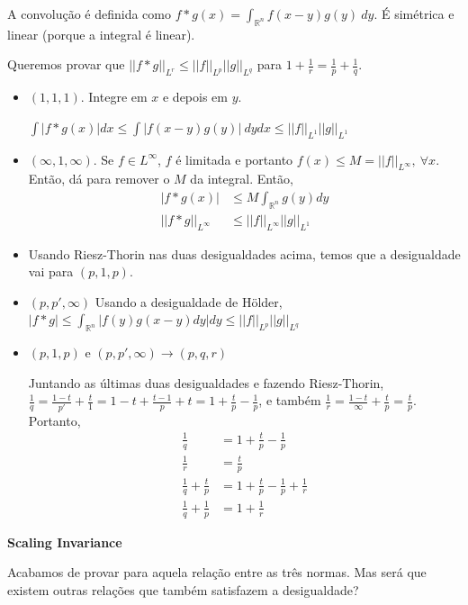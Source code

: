 \documentclass[11pt]{article}
\newcommand{\Rn}{{\mathbb{R}^n}}
\newcommand{\norm}[2]{\left|\left|#1\right|\right|_{L^{#2}}}
\begin{document}
A convolução é definida como \( f * g (x) = \int_\Rn f(x-y)g(y)\ dy \). É simétrica e linear (porque a integral é linear).

Queremos provar que \(\norm{f * g}{r} \leq \norm{f}{p} \norm{g}{q}\) para \( 1 + \frac{1}{r} = \frac{1}{p} + \frac{1}{q} \).

\begin{itemize}
	\item \((1,1,1)\). Integre em \( x \) e depois em \( y \).
	
	\( \int | f * g(x) | dx \leq \int |f(x-y)g(y)|\ dy dx \leq \norm{f}{1} \norm{g}{1}\) 
	
	\item \((\infty, 1, \infty)\). Se \( f \in L^\infty\), \( f \) é limitada e portanto \( f(x)\leq M = \norm{f}{\infty}, \ \forall x \). Então, dá para remover o \( M \) da integral. Então,\begin{align*} |f * g (x) | &\leq M \int_\Rn g(y) dy \\
		\norm{f * g}{\infty} &\leq \norm{f}{\infty} \norm{g}{1}
	\end{align*}

	\item Usando Riesz-Thorin nas duas desigualdades acima, temos que a desigualdade vai para \( (p, 1, p) \).
	
	\item \((p, p', \infty)\) Usando a desigualdade de Hölder, \(| f * g | \leq \int_\Rn |f(y) g(x-y) dy|dy \leq \norm{f}{p} \norm{g}{q}\)
	
	\item \( (p, 1, p) \text{ e } (p, p', \infty) \rightarrow (p, q, r) \)
	
	Juntando as últimas duas desigualdades e fazendo Riesz-Thorin, \( \frac{1}{q} = \frac{1-t}{p'} + \frac{t}{1} = 1-t + \frac{t-1}{p} + t = 1 + \frac{t}{p} - \frac{1}{p}\), e também \( \frac{1}{r} = \frac{1-t}{\infty} + \frac{t}{p} = \frac{t}{p} \). Portanto,
	\begin{align*}
		\frac{1}{q} &= 1 + \frac{t}{p} - \frac{1}{p} \\
		\frac{1}{r} &= \frac{t}{p} \\
		\frac{1}{q} + \frac{t}{p} &= 1 + \frac{t}{p} - \frac{1}{p} + \frac{1}{r} \\
		\frac{1}{q} + \frac{1}{p} &= 1 + \frac{1}{r}
	\end{align*}	
\end{itemize}

\textbf{Scaling Invariance}

Acabamos de provar para aquela relação entre as três normas. Mas será que existem outras relações que também satisfazem a desigualdade? 
\end{document}
